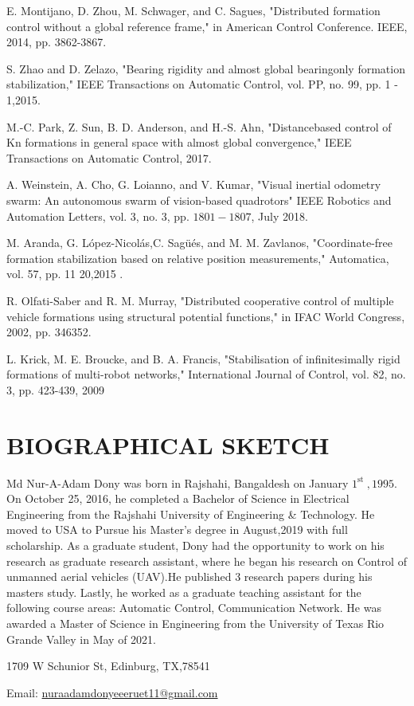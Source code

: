 \documentclass[10pt]{article}
\begin{document}
E. Montijano, D. Zhou, M. Schwager, and C. Sagues, "Distributed formation control without a global reference frame," in American Control Conference. IEEE, 2014, pp. 3862-3867.

S. Zhao and D. Zelazo, "Bearing rigidity and almost global bearingonly formation stabilization," IEEE Transactions on Automatic Control, vol. PP, no. 99, pp. 1 - 1,2015.

M.-C. Park, Z. Sun, B. D. Anderson, and H.-S. Ahn, "Distancebased control of Kn formations in general space with almost global convergence," IEEE Transactions on Automatic Control, 2017.

A. Weinstein, A. Cho, G. Loianno, and V. Kumar, "Visual inertial odometry swarm: An autonomous swarm of vision-based quadrotors" IEEE Robotics and Automation Letters, vol. 3, no. 3, pp. $1801-1807$, July 2018.

M. Aranda, G. López-Nicolás,C. Sagüés, and M. M. Zavlanos, "Coordinate-free formation stabilization based on relative position measurements," Automatica, vol. 57, pp. 11 20,2015 .

R. Olfati-Saber and R. M. Murray, "Distributed cooperative control of multiple vehicle formations using structural potential functions," in IFAC World Congress, 2002, pp. 346352.

L. Krick, M. E. Broucke, and B. A. Francis, "Stabilisation of infinitesimally rigid formations of multi-robot networks," International Journal of Control, vol. 82, no. 3, pp. 423-439, 2009

\section{BIOGRAPHICAL SKETCH}
Md Nur-A-Adam Dony was born in Rajshahi, Bangaldesh on January $1^{\text {st }}, 1995$. On October 25, 2016, he completed a Bachelor of Science in Electrical Engineering from the Rajshahi University of Engineering \& Technology. He moved to USA to Pursue his Master's degree in August,2019 with full scholarship. As a graduate student, Dony had the opportunity to work on his research as graduate research assistant, where he began his research on Control of unmanned aerial vehicles (UAV).He published 3 research papers during his masters study. Lastly, he worked as a graduate teaching assistant for the following course areas: Automatic Control, Communication Network. He was awarded a Master of Science in Engineering from the University of Texas Rio Grande Valley in May of 2021.

1709 W Schunior St, Edinburg, TX,78541

Email: \href{mailto:nuraadamdonyeeeruet11@gmail.com}{nuraadamdonyeeeruet11@gmail.com}
\end{document}
